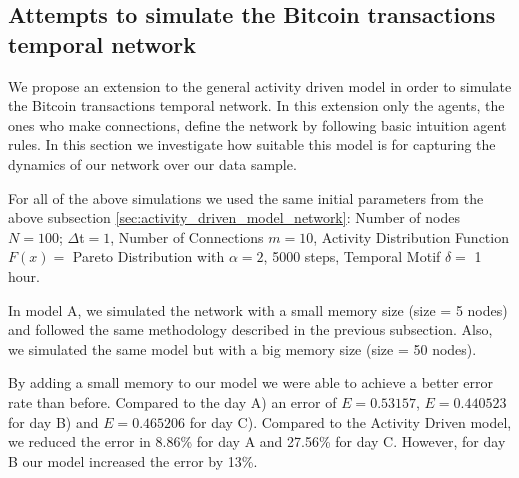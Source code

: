\documentclass[../../thesis.tex]{subfiles}
\begin{document}
\subsection{Attempts to simulate the Bitcoin transactions temporal network}
\label{sec:applying_proposed_activity_driven_model}

We propose an extension to the general activity driven model in order to simulate the Bitcoin transactions temporal network. In this extension only the agents, the ones who make connections, define the network by following basic intuition agent rules. In this section we investigate how suitable this model is for capturing the dynamics of our network over our data sample.


For all of the above simulations we used the same initial parameters from the above subsection \ref{sec:activity_driven_model_network}: Number of nodes $N=100$; $\Delta$t$=1$, Number of Connections $m=10$, Activity Distribution Function $F(x)=$ Pareto Distribution with $\alpha=2$, 5000 steps, Temporal Motif $\delta=$ 1 hour. 

In model A, we simulated the network with a small memory size (size = 5 nodes) and followed the same methodology described in the previous subsection. Also, we simulated the same model but with a big memory size (size = 50 nodes). 

By adding a small memory to our model we were able to achieve a better error rate than before. Compared to the day A) an error of $E=0.53157$, $E=0.440523$ for day B) and $E=0.465206$ for day C).  Compared to the Activity Driven model, we reduced the error in 8.86\% for day A and 27.56\% for day C. However, for day B our model increased the error by 13\%.
\end{document}
